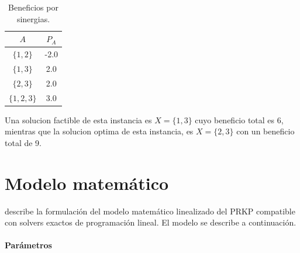 \documentclass[spanish, a4paper, 12pt, openany,final]{book}
\begin{document}
	\begin{table}[H]
		\centering
		\caption{Beneficios por sinergias.}
		\label{tab:sinergias}
		\begin{tabular}{|c|c|}
			\hline
			$A$    & $P_A$\\
			\hline
			$\{1,2\}$ & -2.0 \\
			\hline
			$\{1,3\}$ & 2.0 \\
			\hline
			$\{2,3\}$ & 2.0\\
			\hline
			$\{1,2,3\}$ & 3.0\\
			\hline
		\end{tabular}
	\end{table}
	
	
	Una solucion factible de esta instancia es $X = \{1,3\}$ cuyo beneficio total es 6, mientras que la solucion optima de esta instancia, es $X = \{2,3\}$ con un beneficio total de 9.
	
    
    \section{Modelo matemático}
    
    
    \cite{baldo_polynomial_2023} describe la formulación del modelo matemático linealizado del PRKP compatible con solvers exactos de programación lineal. El modelo se describe a continuación.
    
    \paragraph*{Parámetros}
    
\end{document}
